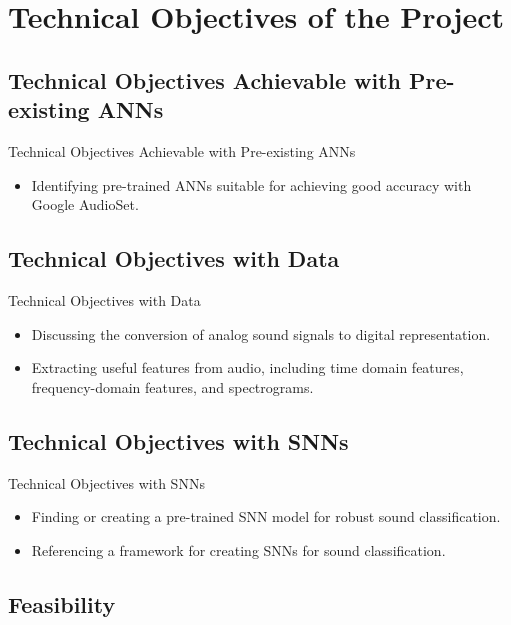 \documentclass[aspectratio=169, 11pt]{beamer}
\begin{document}
\section{Technical Objectives of the Project}

\subsection{Technical Objectives Achievable with Pre-existing ANNs}

\begin{frame}{Technical Objectives Achievable with Pre-existing ANNs}
  \begin{itemize}
    \item Identifying pre-trained ANNs suitable for achieving good accuracy with Google AudioSet.
  \end{itemize}
\end{frame}

\subsection{Technical Objectives with Data}

\begin{frame}{Technical Objectives with Data}
  \begin{itemize}
    \item Discussing the conversion of analog sound signals to digital representation.
    \item Extracting useful features from audio, including time domain features, frequency-domain features, and spectrograms.
  \end{itemize}
\end{frame}

\subsection{Technical Objectives with SNNs}

\begin{frame}{Technical Objectives with SNNs}
  \begin{itemize}
    \item Finding or creating a pre-trained SNN model for robust sound classification.
    \item Referencing a framework for creating SNNs for sound classification.
  \end{itemize}
\end{frame}

\subsection{Feasibility}
\end{document}
